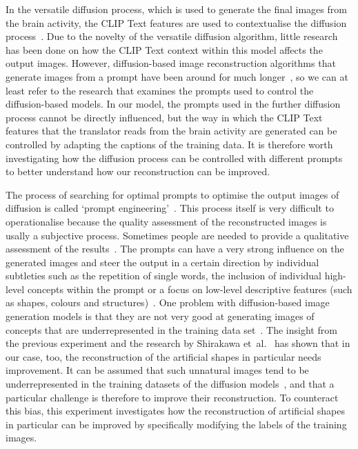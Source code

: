 In the versatile diffusion process, which is used to generate the final images from the  brain activity, the  CLIP Text features are used to contextualise the diffusion process~\cite{ozcelikNaturalSceneReconstruction2023,xuVersatileDiffusionText2024}. Due to the novelty of the versatile diffusion algorithm, little research has been done on how the CLIP Text context within this model affects the output images. However, diffusion-based image reconstruction algorithms that generate images from a prompt have been around for much longer~\cite{rombachHighResolutionImageSynthesis2022,sahariaPhotorealisticTexttoimageDiffusion2022}, so we can at least refer to the research that examines the prompts used to control the diffusion-based models. In our model, the prompts used in the further diffusion process cannot be directly influenced, but the way in which the CLIP Text features that the translator reads from the brain activity are generated can be controlled by adapting the captions of the training data. It is therefore worth investigating how the diffusion process can be controlled with different prompts to better understand how our reconstruction can be improved. 

The process of searching for optimal prompts to optimise the output images of diffusion is called `prompt engineering'~\cite{witteveenInvestigatingPromptEngineering2022}. This process itself is very difficult to operationalise because the quality assessment of the reconstructed images is usally a subjective process. Sometimes people are needed to provide a qualitative assessment of the results~\cite{pavlichenkoBestPromptsTexttoImage2023}. The prompts can have a very strong influence on the generated images and steer the output in a certain direction by individual subtleties such as the repetition of single words,  the inclusion of individual high-level concepts within the prompt or a focus on low-level descriptive features (such as shapes, colours and structures)~\cite{witteveenInvestigatingPromptEngineering2022}. One problem with diffusion-based image generation models is that they are not very good at generating images of concepts that are underrepresented in the training data set~\cite{samuelGeneratingImagesRare2024}. The insight from the previous experiment and the research by Shirakawa et\ al.~\cite{shirakawaSpuriousReconstructionBrain2024} has shown that in our case, too, the reconstruction of the artificial shapes in particular needs improvement. It can be assumed that such unnatural images tend to be underrepresented in the training datasets of the diffusion models~\cite{schuhmannLAION400MOpenDataset2021, schuhmannLAION5BOpenLargescale2022}, and that a particular challenge is therefore to improve their reconstruction. To counteract this bias, this experiment investigates how the reconstruction of artificial shapes in particular can be improved by specifically modifying the labels of the training images. 

